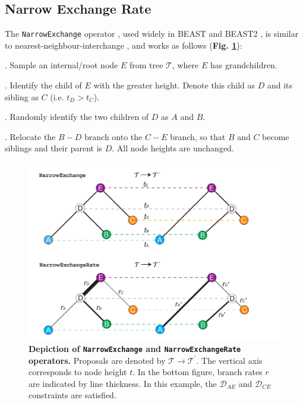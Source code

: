 \documentclass[10pt,letterpaper]{article}
\begin{document}





\clearpage
\subsection*{Narrow Exchange Rate} \label{sect:NER}

The \texttt{NarrowExchange} operator \cite{drummond2002estimating}, used widely in BEAST \cite{drummond2012bayesian,suchard2018bayesian} and BEAST2 \cite{bouckaert2019beast}, is similar to nearest-neighbour-interchange \cite{semple2003phylogenetics}, and works as follows (\textbf{Fig. \ref{fig:narrowexchange}}):

. Sample an internal/root node $E$ from tree $\mathcal{T}$, where $E$ has grandchildren.

. Identify the child of $E$ with the greater height. Denote this child as $D$ and its sibling as $C$ (i.e. $t_D > t_C$).

. Randomly identify the two children of $D$ as $A$ and $B$.

. Relocate the $B-D$ branch onto the $C-E$ branch, so that $B$ and $C$ become siblings and their parent is $D$. All node heights are unchanged.


\begin{figure}[!h]
\includegraphics[width=\textwidth]{Figures/NarrowExchange.pdf}
\caption{\textbf{Depiction of \texttt{NarrowExchange} and \texttt{NarrowExchangeRate} operators.} Proposals are denoted by $\mathcal{T} \rightarrow \mathcal{T}^\prime$. The vertical axis corresponds to node height $t$. In the bottom figure, branch rates $r$ are indicated by line thickness. In this example, the $\mathcal{D}_{AE}$ and $\mathcal{D}_{CE}$ constraints are satisfied.}
\label{fig:narrowexchange}
\end{figure}
\end{document}
